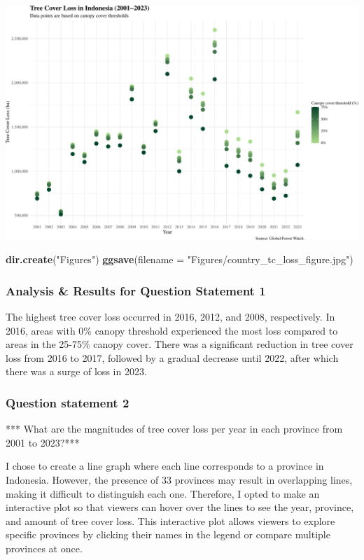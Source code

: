 \documentclass[
]{article}
\newenvironment{Shaded}{\begin{snugshade}}{\end{snugshade}}
\newcommand{\AttributeTok}[1]{\textcolor[rgb]{0.13,0.29,0.53}{#1}}
\newcommand{\FunctionTok}[1]{\textcolor[rgb]{0.13,0.29,0.53}{\textbf{#1}}}
\newcommand{\NormalTok}[1]{#1}
\newcommand{\StringTok}[1]{\textcolor[rgb]{0.31,0.60,0.02}{#1}}
\begin{document}
\includegraphics{index_files/figure-latex/unnamed-chunk-3-1.pdf}

\begin{Shaded}
\begin{Highlighting}[]
\FunctionTok{dir.create}\NormalTok{(}\StringTok{"Figures"}\NormalTok{)}
\FunctionTok{ggsave}\NormalTok{(}\AttributeTok{filename =} \StringTok{"Figures/country\_tc\_loss\_figure.jpg"}\NormalTok{)}
\end{Highlighting}
\end{Shaded}

\subsubsection{Analysis \& Results for Question Statement
1}\label{analysis-results-for-question-statement-1}

The highest tree cover loss occurred in 2016, 2012, and 2008,
respectively. In 2016, areas with 0\% canopy threshold experienced the
most loss compared to areas in the 25-75\% canopy cover. There was a
significant reduction in tree cover loss from 2016 to 2017, followed by
a gradual decrease until 2022, after which there was a surge of loss in
2023.

\subsubsection{Question statement 2}\label{question-statement-2}

*** What are the magnitudes of tree cover loss per year in each province
from 2001 to 2023?***

I chose to create a line graph where each line corresponds to a province
in Indonesia. However, the presence of 33 provinces may result in
overlapping lines, making it difficult to distinguish each one.
Therefore, I opted to make an interactive plot so that viewers can hover
over the lines to see the year, province, and amount of tree cover loss.
This interactive plot allows viewers to explore specific provinces by
clicking their names in the legend or compare multiple provinces at
once.
\end{document}
